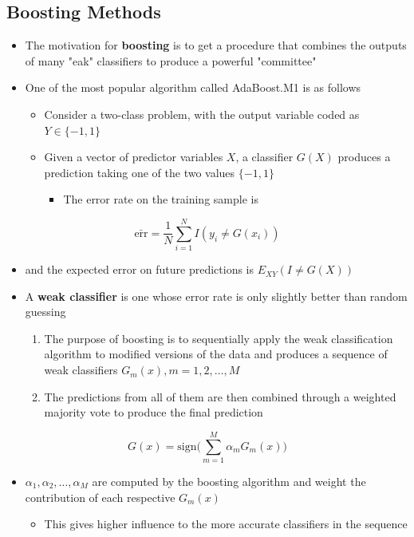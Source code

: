 \documentclass[11pt]{article}
\begin{document}
\subsection{Boosting Methods}
\label{sec:org3b173b8}
\begin{itemize}
\item The motivation for \textbf{boosting} is to get a procedure that combines the outputs of many "eak" classifiers to produce a powerful "committee"

\item One of the most popular algorithm called AdaBoost.M1 is as follows
\begin{itemize}
\item Consider a two-class problem, with the output variable coded as \(Y \in \{-1,1\}\)
\item Given a vector of predictor variables \(X\), a classifier \(G(X)\) produces a prediction taking one of the two values \(\{-1,1\}\)
\begin{itemize}
\item The error rate on the training sample is
\end{itemize}
\end{itemize}
\end{itemize}
\begin{equation}
  \bar{\text{err}} = \frac1N \sum_{i=1}^N I(y_i \ne G(x_i))
\end{equation}
\begin{itemize}
\item and the expected error on future predictions is \(E_{XY}(I \ne G(X))\)

\item A \textbf{weak classifier} is one whose error rate is only slightly better than random guessing
\begin{enumerate}
\item The purpose of boosting is to sequentially apply the weak classification algorithm to modified versions of the data and produces a sequence of weak classifiers \(G_m(x),m=1,2,\dots,M\)
\item The predictions from all of them are then combined through a weighted majority vote to produce the final prediction
\end{enumerate}
\end{itemize}
\begin{equation}
  G(x) = \text{sign} \bigg( \sum_{m=1}^M \alpha_mG_m(x) \bigg)
\end{equation}
\begin{itemize}
\item \(\alpha_1, \alpha_2, \dots, \alpha_M\) are computed by the boosting algorithm and weight the contribution of each respective \(G_m(x)\)
\begin{itemize}
\item This gives higher influence to the more accurate classifiers in the sequence
\end{itemize}
\end{itemize}
\end{document}

